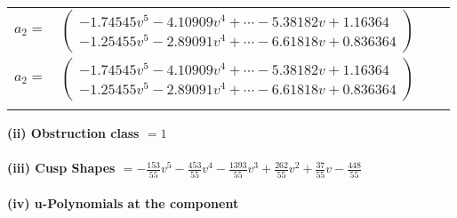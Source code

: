 \documentclass[1p]{elsarticle_modified}
\theoremstyle{definition}
\begin{document}
\begin{tabular}{m{7pt} m{180pt} m{7pt} m{180pt} }
\flushright $a_{2}=$&$\begin{pmatrix}-1.74545 v^{5}-4.10909 v^{4}+\cdots-5.38182 v+1.16364\\-1.25455 v^{5}-2.89091 v^{4}+\cdots-6.61818 v+0.836364\end{pmatrix}$\\ \flushright $a_{2}=$&$\begin{pmatrix}-1.74545 v^{5}-4.10909 v^{4}+\cdots-5.38182 v+1.16364\\-1.25455 v^{5}-2.89091 v^{4}+\cdots-6.61818 v+0.836364\end{pmatrix}$\\&\end{tabular}
\flushleft \textbf{(ii) Obstruction class $= 1$}\\~\\
\flushleft \textbf{(iii) Cusp Shapes $= -\frac{153}{55} v^5-\frac{453}{55} v^4-\frac{1393}{55} v^3+\frac{262}{55} v^2+\frac{37}{55} v-\frac{448}{55}$}\\~\\
\newpage\renewcommand{\arraystretch}{1}
\flushleft \textbf{(iv) u-Polynomials at the component}\newline \\
\end{document}
